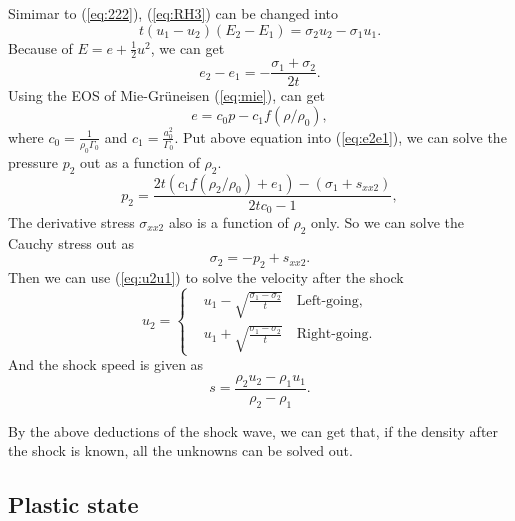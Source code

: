 \documentclass[review]{elsarticle}
\begin{document}
Simimar to (\ref{eq:222}), (\ref{eq:RH3}) can be changed into
\begin{equation}
  t(u_1-u_2)(E_2-E_1) =\sigma_2 u_2-\sigma_1u_1.
\end{equation}
Because of $E= e+\frac{1}{2}u^2$, we can get
\begin{equation}\label{eq:e2e1}
  e_2 - e_1 = - \frac{\sigma_1 +\sigma_2}{2t}.
\end{equation}
Using the EOS of Mie-Gr\"uneisen (\ref{eq:mie}), can get
\begin{equation}
  e = c_0p -c_1f(\rho/\rho_0),
\end{equation}
where $c_0 = \frac{1}{\rho_0\Gamma_0}$ and $c_1 = \frac{a_0^2}{\Gamma_0}$.
Put above equation into (\ref{eq:e2e1}), we can solve the pressure $p_2$ out as a function of $\rho_2$. 
\begin{equation}\label{eq:shocke}
  p_2= \frac{2t(c_1f(\rho_2/\rho_0)+e_1)-(\sigma_1+s_{xx2})}{2tc_0-1},
\end{equation}
The derivative stress $\sigma_{xx2}$ also is  a function of $\rho_2$ only. So we can solve the Cauchy stress out as
\begin{equation}
  \sigma_2 = -p_2 +s_{xx2}.
\end{equation}
Then we can use (\ref{eq:u2u1}) to solve the velocity after the shock
\begin{equation}\label{eq:shocku}
  u_2 = \left\{ \begin{aligned}
	 & u_1 - \sqrt{\frac{\sigma_1- \sigma_2}{t}} \quad \text{Left-going}, \\
	 & u_1 + \sqrt{\frac{\sigma_1- \sigma_2}{t}} \quad \text{Right-going}.
	\end{aligned}
	\right.
  \end{equation}
And the shock speed is given as 
\begin{equation}
  s = \frac{\rho_2u_2-\rho_1u_1}{\rho_2-\rho_1}.
\end{equation}

By the above deductions of the shock wave, we can get that, if the density after the shock is known, all the unknowns can be solved out.

\subsection{Plastic state}
\end{document}
